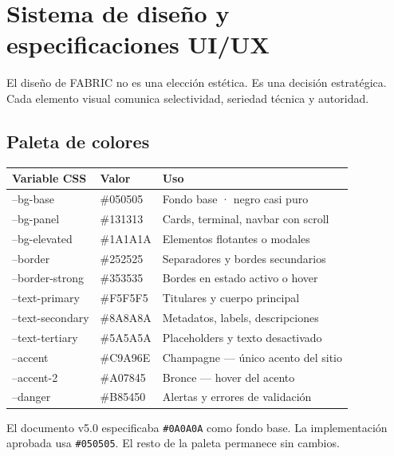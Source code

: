 \documentclass[11pt, a4paper]{article}
\newcommand{\token}[1]{\texttt{\color{accent}#1}}
\begin{document}
\newpage


\section{Sistema de diseño y especificaciones UI/UX}

El diseño de FABRIC no es una elección estética. Es una decisión estratégica.
Cada elemento visual comunica selectividad, seriedad técnica y autoridad.

\subsection{Paleta de colores}

\begin{table}[h]
\centering
\begin{tabularx}{\linewidth}{>{\ttfamily\color{accent}\small}l >{\ttfamily}l X}
\toprule
Variable CSS & Valor & Uso \\
\midrule
--bg-base       & \#050505 & Fondo base · negro casi puro \\
--bg-panel      & \#131313 & Cards, terminal, navbar con scroll \\
--bg-elevated   & \#1A1A1A & Elementos flotantes o modales \\
--border        & \#252525 & Separadores y bordes secundarios \\
--border-strong & \#353535 & Bordes en estado activo o hover \\
--text-primary  & \#F5F5F5 & Titulares y cuerpo principal \\
--text-secondary & \#8A8A8A & Metadatos, labels, descripciones \\
--text-tertiary & \#5A5A5A & Placeholders y texto desactivado \\
--accent        & \#C9A96E & Champagne — único acento del sitio \\
--accent-2      & \#A07845 & Bronce — hover del acento \\
--danger        & \#B85450 & Alertas y errores de validación \\
\bottomrule
\end{tabularx}
\end{table}

\begin{notatec}
El documento v5.0 especificaba \token{\#0A0A0A} como fondo base. La implementación
aprobada usa \token{\#050505}. El resto de la paleta permanece sin cambios.
\end{notatec}
\end{document}
